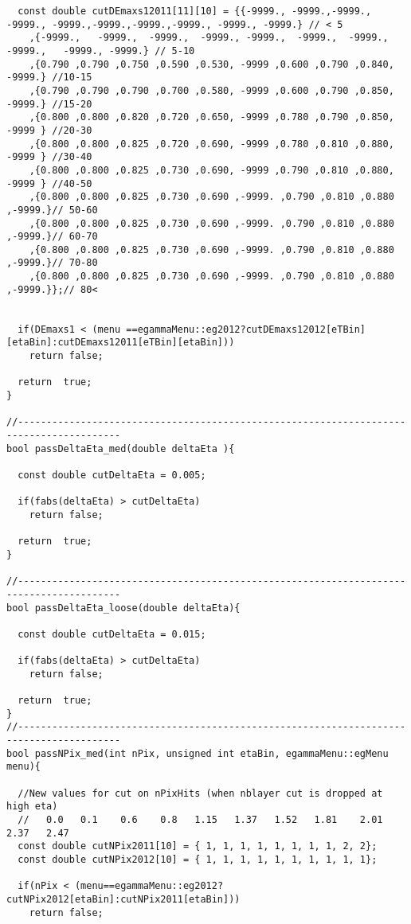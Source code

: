 \begin{lstlisting}
  const double cutDEmaxs12011[11][10] = {{-9999., -9999.,-9999., -9999., -9999.,-9999.,-9999.,-9999., -9999., -9999.} // < 5  
	,{-9999.,   -9999.,  -9999.,  -9999., -9999.,  -9999.,  -9999.,  -9999.,   -9999., -9999.} // 5-10  
	,{0.790 ,0.790 ,0.750 ,0.590 ,0.530, -9999 ,0.600 ,0.790 ,0.840, -9999.} //10-15
	,{0.790 ,0.790 ,0.790 ,0.700 ,0.580, -9999 ,0.600 ,0.790 ,0.850, -9999.} //15-20
	,{0.800 ,0.800 ,0.820 ,0.720 ,0.650, -9999 ,0.780 ,0.790 ,0.850, -9999 } //20-30
	,{0.800 ,0.800 ,0.825 ,0.720 ,0.690, -9999 ,0.780 ,0.810 ,0.880, -9999 } //30-40
	,{0.800 ,0.800 ,0.825 ,0.730 ,0.690, -9999 ,0.790 ,0.810 ,0.880, -9999 } //40-50
	,{0.800 ,0.800 ,0.825 ,0.730 ,0.690 ,-9999. ,0.790 ,0.810 ,0.880 ,-9999.}// 50-60  
	,{0.800 ,0.800 ,0.825 ,0.730 ,0.690 ,-9999. ,0.790 ,0.810 ,0.880 ,-9999.}// 60-70
	,{0.800 ,0.800 ,0.825 ,0.730 ,0.690 ,-9999. ,0.790 ,0.810 ,0.880 ,-9999.}// 70-80
	,{0.800 ,0.800 ,0.825 ,0.730 ,0.690 ,-9999. ,0.790 ,0.810 ,0.880 ,-9999.}};// 80<  


  if(DEmaxs1 < (menu ==egammaMenu::eg2012?cutDEmaxs12012[eTBin][etaBin]:cutDEmaxs12011[eTBin][etaBin]))
    return false;

  return  true;
}

//----------------------------------------------------------------------------------------
bool passDeltaEta_med(double deltaEta ){
  
  const double cutDeltaEta = 0.005;
  
  if(fabs(deltaEta) > cutDeltaEta)
    return false;
    
  return  true;
}

//----------------------------------------------------------------------------------------
bool passDeltaEta_loose(double deltaEta){
  
  const double cutDeltaEta = 0.015;

  if(fabs(deltaEta) > cutDeltaEta)
    return false;
    
  return  true;
}
//----------------------------------------------------------------------------------------
bool passNPix_med(int nPix, unsigned int etaBin, egammaMenu::egMenu menu){
  
  //New values for cut on nPixHits (when nblayer cut is dropped at high eta)
  //   0.0   0.1    0.6    0.8   1.15   1.37   1.52   1.81    2.01   2.37   2.47
  const double cutNPix2011[10] = { 1, 1, 1, 1, 1, 1, 1, 1, 2, 2};   
  const double cutNPix2012[10] = { 1, 1, 1, 1, 1, 1, 1, 1, 1, 1};   
				    
  if(nPix < (menu==egammaMenu::eg2012?cutNPix2012[etaBin]:cutNPix2011[etaBin]))
    return false;
    

\end{lstlisting}
